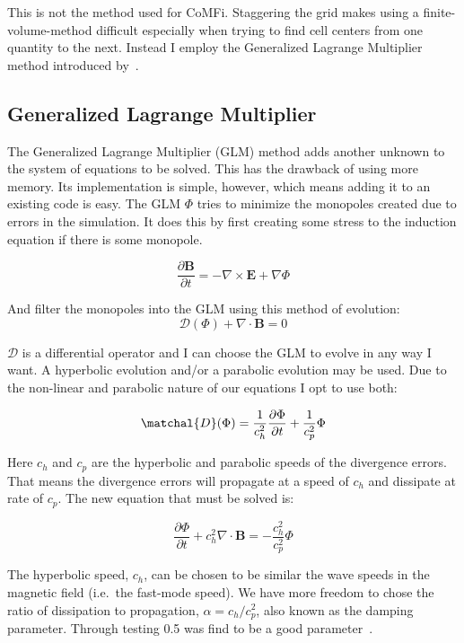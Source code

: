 \documentclass[12pt,upcase]{umlthesis}
\begin{document}
This is not the method used for CoMFi. Staggering the grid makes using a finite-volume-method difficult especially when trying to find cell centers from one quantity to the next. Instead I employ the Generalized Lagrange Multiplier method introduced by~\citet{glm}.

\subsection{Generalized Lagrange Multiplier}

The Generalized Lagrange Multiplier (GLM) method adds another unknown to the system of equations to be solved. This has the drawback of using more memory. Its implementation is simple, however, which means adding it to an existing code is easy. The GLM $\Phi$ tries to minimize the monopoles created due to errors in the simulation. It does this by first creating some stress to the induction equation if there is some monopole.

\begin{equation}
	\frac{\partial\textbf{B}}{\partial t} = - \nabla\times\textbf{E} + \nabla \Phi
\end{equation}

And filter the monopoles into the GLM using this method of evolution:
\begin{equation}
	\mathcal{D}(\Phi) + \nabla\cdot\textbf{B} = 0
\end{equation}

$\mathcal{D}$ is a differential operator and I can choose the GLM to evolve in any way I want. A hyperbolic evolution and/or a parabolic evolution may be used. Due to the non-linear and parabolic nature of our equations I opt to use both:

\begin{equation}
	\matchal{D}(\Phi) = \frac{1}{c^2_h}\frac{\partial\Phi}{\partial t} + \frac{1}{c^2_p}\Phi
\end{equation}

Here $c_h$ and $c_p$ are the hyperbolic and parabolic speeds of the divergence errors. That means the divergence errors will propagate at a speed of $c_h$ and dissipate at rate of $c_p$. The new equation that must be solved is:

\begin{equation}\label{eq:glm}
	\frac{\partial\Phi}{\partial t} + c^2_h \nabla\cdot\textbf{B} = - \frac{c^2_h}{c^2_p} \Phi
\end{equation}

The hyperbolic speed, $c_h$, can be chosen to be similar the wave speeds in the magnetic field (i.e.\ the fast-mode speed). We have more freedom to chose the ratio of dissipation to propagation, $\alpha = c_h / c^2_p$, also known as the damping parameter. Through testing 0.5 was find to be a good parameter~\citep[p. 5899-5911]{glm2}.
\end{document}
